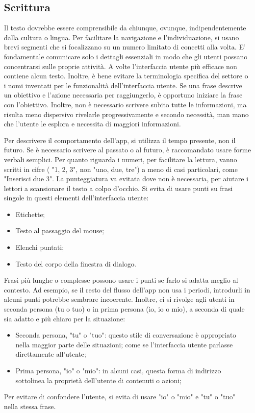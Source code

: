 \documentclass[12pt, a4paper]{report}
\begin{document}
	\subsection{Scrittura}
	Il testo dovrebbe essere comprensibile da chiunque, ovunque, indipendentemente dalla cultura o lingua. Per facilitare la navigazione e l'individuazione, si usano brevi segmenti che si focalizzano su un numero limitato di concetti alla volta. E’ fondamentale comunicare solo
	i dettagli essenziali in modo che gli utenti possano concentrarsi sulle proprie attività. A volte l'interfaccia utente più efficace non contiene alcun testo.  Inoltre, è bene evitare la terminologia specifica del settore o i nomi inventati per le funzionalità dell'interfaccia utente.
	Se una frase descrive un obiettivo e l'azione necessaria per raggiungerlo, è opportuno iniziare la frase con l'obiettivo. Inoltre, non è necessario scrivere subito tutte le informazioni, ma risulta meno dispersivo rivelarle progressivamente e secondo necessità, man mano che l'utente le esplora e necessita di maggiori informazioni.


	Per descrivere il comportamento dell’app, si utilizza il tempo presente, non il futuro. Se è necessario scrivere al passato o al futuro, è raccomandato usare forme verbali semplici. Per quanto riguarda i numeri,  per facilitare la lettura, vanno scritti in cifre ( "1, 2, 3", non "uno, due, tre") a meno di casi particolari, come "Inserisci due 3".
	La punteggiatura va evitata dove non è necessaria, per aiutare i lettori a scansionare il testo a colpo d'occhio. Si evita di usare punti su frasi singole in questi elementi dell'interfaccia utente:
	\begin{itemize}
		\item Etichette;
		\item Testo al passaggio del mouse;
		\item Elenchi puntati;
		\item Testo del corpo della finestra di dialogo.
	\end{itemize}
	Frasi più lunghe o complesse possono usare i punti se farlo si adatta meglio al contesto. Ad esempio, se il resto del flusso dell'app non usa i periodi, introdurli in alcuni punti potrebbe sembrare incoerente.
	Inoltre, ci si rivolge agli utenti in seconda persona (tu o tuo) o in prima persona (io, io o mio), a seconda di quale sia adatto e più chiaro per la situazione:
	\begin{itemize}
		\item Seconda persona, "tu" o "tuo": questo stile di conversazione è appropriato nella maggior parte delle situazioni; come se l'interfaccia utente parlasse direttamente all'utente;
		\item Prima persona, "io"  o "mio": in alcuni casi, questa forma di indirizzo sottolinea la proprietà dell'utente di contenuti o azioni;
	\end{itemize}
	Per evitare di confondere l'utente, si evita di usare "io" o "mio" e "tu" o "tuo" nella stessa frase.
\end{document}
